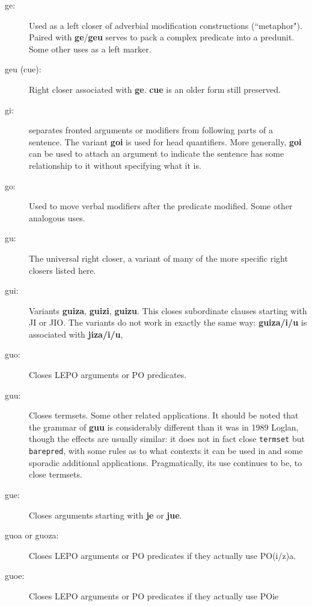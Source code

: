 \documentclass[12pt]{book}
\begin{document}
{\begin{description}
\item[ge:]   Used as a left closer of adverbial modification constructions (``metaphor").  Paired with {\bf ge}/{\bf geu} serves to pack a complex predicate into a predunit.  Some other uses as a left marker.

\item[geu (cue):]   Right closer associated with {\bf ge}.  {\bf cue} is an older form still preserved.

\item[gi:]  separates fronted arguments or modifiers from following parts of a sentence.  The variant {\bf goi} is used for head quantifiers.  More generally, {\bf goi} can be used to attach an argument to indicate the sentence has some relationship to it without specifying what it is.

\item[go:]  Used to move verbal modifiers after the predicate modified.  Some other analogous uses.

\item[gu:]  The universal right closer, a variant of many of the more specific right closers listed here.

\item[gui:]  Variants {\bf guiza}, {\bf guizi}, {\bf guizu}.  This closes subordinate clauses starting with JI or JIO.
The variants do not work in exactly the same way:  {\bf guiza/i/u} is associated with {\bf jiza/i/u},

\item[guo:]  Closes LEPO arguments or PO predicates.

\item[guu:]  Closes termsets.  Some other related applications.  It should be noted that the grammar of {\bf guu} is considerably different than it was in 1989 Loglan, though the effects are usually similar:  it does not in fact close {\tt termset} but {\tt barepred}, with some rules as to what contexts it can be used in and some sporadic additional applications.
Pragmatically, its use continues to be, to close termsets.

\item[gue:]   Closes arguments starting with {\bf je} or {\bf jue}.

\item[guoa or guoza:]  Closes LEPO arguments or PO predicates if they actually use PO(i/z)a.

\item[guoe:] Closes LEPO arguments or PO predicates if they actually use POie


\end{description}}
\end{document}
